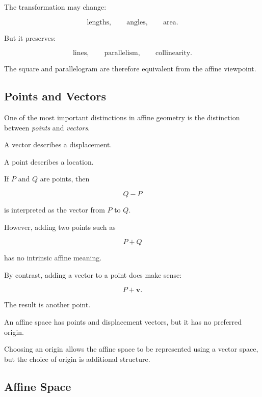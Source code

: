 The transformation may change:

\[
\text{lengths},\qquad
\text{angles},\qquad
\text{area}.
\]

But it preserves:

\[
\text{lines},\qquad
\text{parallelism},\qquad
\text{collinearity}.
\]

The square and parallelogram are therefore equivalent from the affine
viewpoint.

\subsection{Points and Vectors}
\label{subsec:affine-points-vectors}

One of the most important distinctions in affine geometry is the distinction
between \emph{points} and \emph{vectors}.

A vector describes a displacement.

A point describes a location.

If \(P\) and \(Q\) are points, then

\[ Q-P \]

is interpreted as the vector from \(P\) to \(Q\).

However, adding two points such as

\[ P+Q \]

has no intrinsic affine meaning.

By contrast, adding a vector to a point does make sense:

\[ P+\mathbf{v}. \]

The result is another point.

\begin{importantbox}
An affine space has points and displacement vectors, but it has no preferred
origin.

Choosing an origin allows the affine space to be represented using a vector
space, but the choice of origin is additional structure.
\end{importantbox}

\subsection{Affine Space}
\label{subsec:affine-space}

